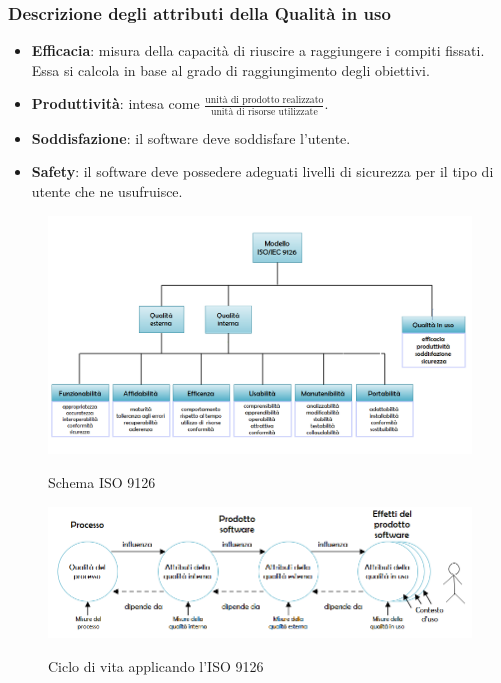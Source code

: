 		\subsubsection{Descrizione degli attributi della Qualità in uso}
		\begin{itemize}
			\item \textbf{Efficacia}: misura della capacità di riuscire a raggiungere i compiti fissati. Essa si calcola
			in base al grado di raggiungimento degli obiettivi.
			\item \textbf{Produttività}: intesa come $ \frac{\text{unità di prodotto realizzato}}{\text{unità di risorse utilizzate}} $.
			\item \textbf{Soddisfazione}: il software deve soddisfare l'utente.
			\item \textbf{Safety}: il software deve possedere adeguati livelli di sicurezza per il tipo di utente che ne usufruisce.
		\end{itemize}
	
	\begin{figure}[H]
		\includegraphics[width=\textwidth]{img/ISO9126.png}
		\label{fig:iso9126}
		\caption[Schema ISO 9126]{Schema ISO 9126 \protect\footnotemark}
	\end{figure}

	
	\begin{figure}[H]
		\includegraphics[width=\textwidth]{img/Ciclo_di_vita_9126.png}
		\label{fig:ciclo_di_vita}
		\caption[Ciclo di vita con l'ISO 9126]{Ciclo di vita applicando l'ISO 9126 \protect\footnotemark[1]}
	\end{figure}

